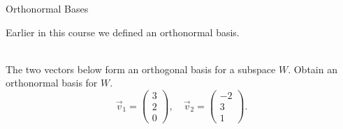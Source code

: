 \begin{frame}{Orthonormal Bases} 

    Earlier in this course we defined an orthonormal basis. 
    
    \pause 
    
    \begin{center}\end{center}
    \pause 
     \\
    The two vectors below form an orthogonal basis for a subspace $W$. Obtain an orthonormal basis for $W$. 
    \begin{equation*}
        \vec v_1 =\begin{pmatrix} 3 \\ 2 \\ 0 \end{pmatrix}, 
        \quad 
        \vec v_2 =\begin{pmatrix} -2 \\ 3 \\ 1 \end{pmatrix}. 
    \end{equation*}
\end{frame}



